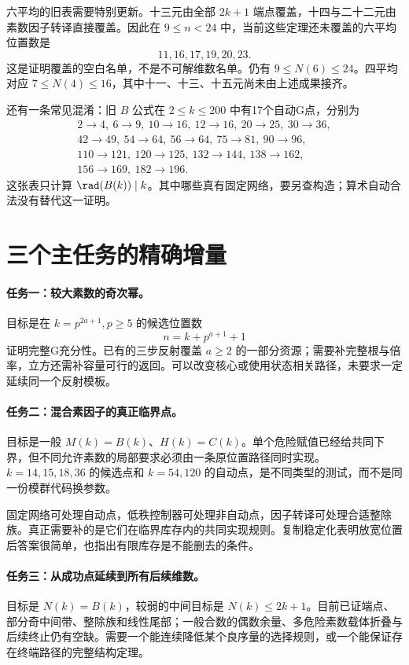 六平均的旧表需要特别更新。十三元由全部 $2k+1$ 端点覆盖，十四与二十二元由素数因子转译直接覆盖。因此在 $9\le n<24$ 中，当前这些定理还未覆盖的六平均位置数是
\[11,16,17,19,20,23.
\]
这是证明覆盖的空白名单，不是不可解维数名单。仍有 $9\le N(6)\le24$。四平均对应 $7\le N(4)\le16$，其中十一、十三、十五元尚未由上述成果接齐。

还有一条常见混淆：旧 $B$ 公式在 $2\le k\le200$ 中有17个自动G点，分别为
\[
\begin{gathered}
2\to4,\ 6\to9,\ 10\to16,\ 12\to16,\ 20\to25,\ 30\to36,\\
42\to49,\ 54\to64,\ 56\to64,\ 75\to81,\ 90\to96,\\
110\to121,\ 120\to125,\ 132\to144,\ 138\to162,\\
156\to169,\ 182\to196.
\end{gathered}
\]
这张表只计算 $\rad(B(k))\mid k$。其中哪些真有固定网络，要另查构造；算术自动合法没有替代这一证明。

\section{三个主任务的精确增量}
\paragraph{任务一：较大素数的奇次幂。}
目标是在 $k=p^{2a+1},p\ge5$ 的候选位置数
\[n=k+p^{a+1}+1
\]
证明完整G充分性。已有的三步反射覆盖 $a\ge2$ 的一部分资源；需要补完整根与倍率，立方还需补容量可行的返回。可以改变核心或使用状态相关路径，未要求一定延续同一个反射模板。

\paragraph{任务二：混合素因子的真正临界点。}
目标是一般 $M(k)=B(k)$、$H(k)=C(k)$。单个危险赋值已经给共同下界，但不同允许素数的局部要求必须由一条原位置路径同时实现。$k=14,15,18,36$ 的候选点和 $k=54,120$ 的自动点，是不同类型的测试，而不是同一份模群代码换参数。

固定网络可处理自动点，低秩控制器可处理非自动点，因子转译可处理合适整除族。真正需要补的是它们在临界库存内的共同实现规则。复制稳定化表明放宽位置后答案很简单，也指出有限库存是不能删去的条件。

\paragraph{任务三：从成功点延续到所有后续维数。}
目标是 $N(k)=B(k)$，较弱的中间目标是 $N(k)\le2k+1$。目前已证端点、部分奇中间带、整除族和线性尾部；一般合数的偶数余量、多危险素数载体折叠与后续终止仍有空缺。需要一个能连续降低某个良序量的选择规则，或一个能保证存在终端路径的完整结构定理。

